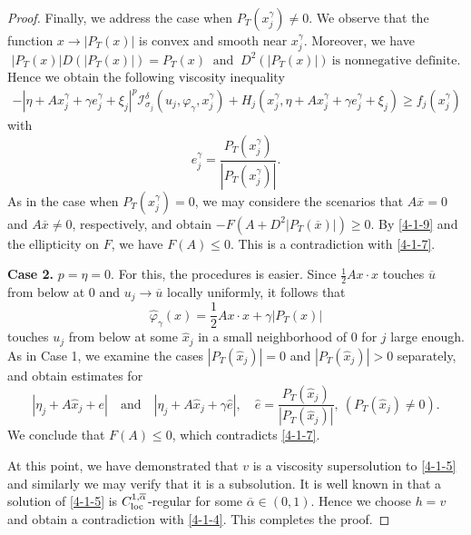 \documentclass[11pt,reqno]{amsart}
\numberwithin{equation}{section}
\begin{document}
\begin{proof}
Finally, we address the case when $P_T(x^\gamma_j)\neq0$. We observe that the function $x\rightarrow|P_T(x)|$ is convex and smooth near $x^\gamma_j$. Moreover, we have
\begin{equation}
\label{4-1-9}
|P_T(x)|D(|P_T(x)|)=P_T(x) \ \text{ and } \ D^2(|P_T(x)|) \ \text{is nonnegative definite}.
\end{equation}
Hence we obtain the following viscosity inequality
\begin{align*}
-|\eta+Ax^\gamma_j+\gamma e^\gamma_j+\xi_j|^p\mathcal{I}^\delta_{\sigma_j}(u_j,\varphi_\gamma,x^\gamma_j)+H_j(x^\gamma_j,\eta+Ax^\gamma_j+\gamma e^\gamma_j+\xi_j)\ge f_j(x^\gamma_j)
\end{align*}
with
$$
e^\gamma_j=\frac{P_T(x^\gamma_j)}{|P_T(x^\gamma_j)|}.
$$
As in the case when $P_T(x^\gamma_j)=0$, we may considere the scenarios that $A\overline{x}=0$ and $A\overline{x}\neq0$, respectively, and obtain $-F(A+D^2|P_T(\overline{x})|)\ge0$.
By \eqref{4-1-9} and the ellipticity on $F$, we have $F(A)\le0$. This is a contradiction with \eqref{4-1-7}.%

\medskip

\textbf{Case 2.} $p=\eta=0$. For this, the procedures is easier. Since $\frac{1}{2}Ax\cdot x$ touches $\overline{u}$ from below at 0 and $u_j\rightarrow\overline{u}$ locally uniformly, it follows that
$$
\hat{\varphi}_\gamma(x)=\frac{1}{2}Ax\cdot x+\gamma|P_T(x)|
$$
touches $u_j$ from below at some $\hat{x}_j$ in a small neighborhood of 0 for $j$ large enough.
As in  Case 1, we examine the cases $|P_T(\hat{x}_j)|=0$ and $|P_T(\hat{x}_j)|>0$ separately, and obtain estimates for
$$|\eta_j+A\hat{x}_j+e|
\quad\text{and}\quad
|\eta_j+A\hat{x}_j+\gamma \hat{e}|,
\quad \hat{e}=\frac{P_T(\hat{x}_j)}{|P_T(\hat{x}_j)|},\ (P_T(\hat{x}_j)\neq0).
$$
We conclude that $F(A)\leq0$, which contradicts \eqref{4-1-7}.

At this point, we have demonstrated that $v$ is a viscosity supersolution to \eqref{4-1-5} and similarly we may verify that it is a subsolution. It is well known in \cite[Chapter 5]{CC95} that a solution of \eqref{4-1-5} is $C^{1,\overline{\alpha}}_{\rm loc}$-regular for some $\overline{\alpha}\in (0,1)$. Hence we choose $h=v$ and obtain a contradiction with \eqref{4-1-4}. This completes the proof.%
\end{proof}
\end{document}
